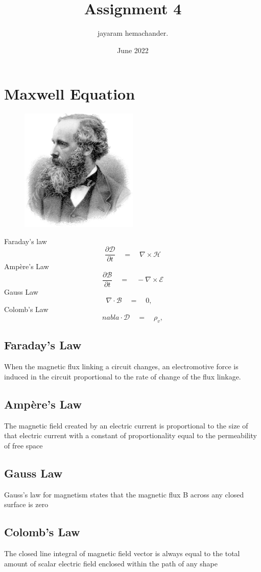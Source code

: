 \documentclass{article}
\title{Assignment 4}
\author{jayaram hemachander.}
\date{June 2022}
\begin{document}
\maketitle
\section{Maxwell Equation}
\begin{figure}[h]
\centering\includegraphics[width=0.5\textwidth]{maxwell}
\end{figure}
Faraday's law
$$ \frac{\partial\mathcal{D}}{\partial t} \quad  = \quad \nabla\times\mathcal{H}$$
Ampère's Law
$$ \frac{\partial\mathcal{B}}{\partial t} \quad  = \quad -\nabla\times\mathcal{E}$$
Gauss Law
$$ \nabla\cdot\mathcal{B}\quad  = \quad 0, \quad$$
Colomb's Law
$$ nabla\cdot\mathcal{D}\quad  = \quad \rho_{v} ,$$

\subsection{Faraday's Law}
When the magnetic flux linking a circuit changes, an electromotive force is induced in the circuit proportional to the rate of change of the flux linkage.
\subsection{Ampère's Law}
The magnetic field created by an electric current is proportional to the size of that electric current with a constant of proportionality equal to the permeability of free space
\subsection{Gauss Law}
Gauss's law for magnetism states that the magnetic flux B across any closed surface is zero
\subsection{Colomb's Law}
The closed line integral of magnetic field vector is always equal to the total amount of scalar electric field enclosed within the path of any shape
\end{document}
